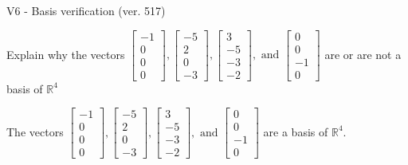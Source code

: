 \begin{exercise}
  \begin{exerciseTitle}V6 - Basis verification (ver. 517)\end{exerciseTitle}
  \begin{exerciseStatement}
    Explain why the vectors \(\left[\begin{array}{r}
-1 \\
0 \\
0 \\
0
\end{array}\right] , \left[\begin{array}{r}
-5 \\
2 \\
0 \\
-3
\end{array}\right] , \left[\begin{array}{r}
3 \\
-5 \\
-3 \\
-2
\end{array}\right] , \text{ and } \left[\begin{array}{r}
0 \\
0 \\
-1 \\
0
\end{array}\right]\) are or are not a basis of \(\mathbb{R}^4\)	


  \end{exerciseStatement}
  \begin{exerciseAnswer}
   The vectors \(\left[\begin{array}{r}
-1 \\
0 \\
0 \\
0
\end{array}\right] , \left[\begin{array}{r}
-5 \\
2 \\
0 \\
-3
\end{array}\right] , \left[\begin{array}{r}
3 \\
-5 \\
-3 \\
-2
\end{array}\right] , \text{ and } \left[\begin{array}{r}
0 \\
0 \\
-1 \\
0
\end{array}\right]\) 
  	 are  a basis of \(\mathbb{R}^4\).
  


  \end{exerciseAnswer}
\end{exercise}
